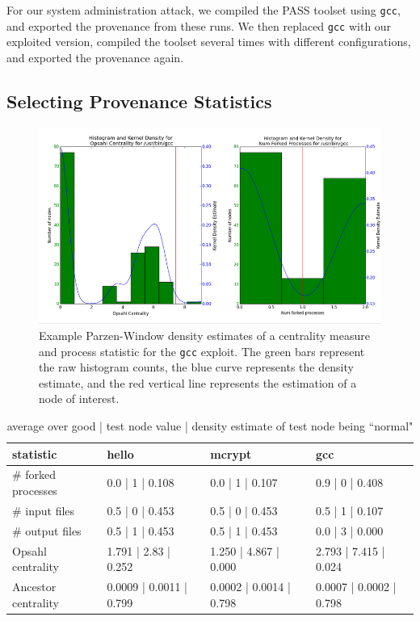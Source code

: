 \documentclass[10pt,twocolumn]{article}
\begin{document}
For our system administration attack, we compiled the PASS toolset using \texttt{gcc}, and exported the provenance from these runs. We then replaced \texttt{gcc} with our exploited version, compiled the toolset several times with different configurations, and exported the provenance again.

\subsection{Selecting Provenance Statistics}

\begin{figure}
  \label{kde-example}
  \centering
    \includegraphics[width=\textwidth]{img/hist.png}
      \caption{Example Parzen-Window density estimates of a centrality measure and process statistic for the \texttt{gcc} exploit. The green bars represent the raw histogram counts, the blue curve represents the density estimate, and the red vertical line represents the estimation of a node of interest.}
\end{figure}

\begin{table}[ht]
\label{results}
{\small
  \begin{center}
  \begin{tabular}{| l | l | l | l |}
    \hline
    statistic & hello & mcrypt & gcc \\ \hline
     \# forked processes & 0.0 | 1 | 0.108 & 0.0 | 1 | 0.107 & 0.9 | 0 | 0.408 \\ \hline
     \# input files & 0.5 | 0 | 0.453 & 0.5 | 0 | 0.453 & 0.5 | 1 | 0.107 \\ \hline
     \# output files & 0.5 | 1 | 0.453 & 0.5 | 1 | 0.453 & 0.0 | 3 | 0.000 \\ \hline
    Opsahl centrality & 1.791 | 2.83 | 0.252 & 1.250 | 4.867 | 0.000 & 2.793 | 7.415 | 0.024 \\ \hline
    Ancestor centrality & 0.0009 | 0.0011 | 0.799 & 0.0002 | 0.0014 | 0.798 & 0.0007 | 0.0002 | 0.798 \\

    \hline
  \end{tabular}
  \end{center}
}
\hfill{}
\caption{average over good | test node value | density estimate of test node being ``normal"
}
\label{tb:tablename}
\end{table}
\end{document}

